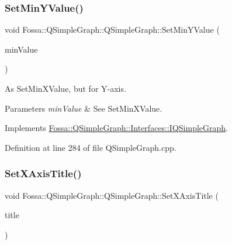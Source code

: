 \subsubsection{\texorpdfstring{Set\+Min\+Y\+Value()}{SetMinYValue()}}
{\footnotesize\ttfamily void Fossa\+::\+Q\+Simple\+Graph\+::\+Q\+Simple\+Graph\+::\+Set\+Min\+Y\+Value (\begin{DoxyParamCaption}\item[{double}]{min\+Value }\end{DoxyParamCaption})\hspace{0.3cm}{\ttfamily [virtual]}}



As Set\+Min\+X\+Value, but for Y-\/axis. 


\begin{DoxyParams}{Parameters}
{\em min\+Value} & See Set\+Min\+X\+Value. \\
\hline
\end{DoxyParams}


Implements \hyperlink{class_fossa_1_1_q_simple_graph_1_1_interfaces_1_1_i_q_simple_graph_a3fdd1f6b538e2dfbf4a0140acd6b6e94}{Fossa\+::\+Q\+Simple\+Graph\+::\+Interfaces\+::\+I\+Q\+Simple\+Graph}.



Definition at line 284 of file Q\+Simple\+Graph.\+cpp.

\mbox{\label{class_fossa_1_1_q_simple_graph_1_1_q_simple_graph_a7579da572b54d43ccec3d2bd572b6cfa}} 
\subsubsection{\texorpdfstring{Set\+X\+Axis\+Title()}{SetXAxisTitle()}}
{\footnotesize\ttfamily void Fossa\+::\+Q\+Simple\+Graph\+::\+Q\+Simple\+Graph\+::\+Set\+X\+Axis\+Title (\begin{DoxyParamCaption}\item[{Q\+String}]{title }\end{DoxyParamCaption})\hspace{0.3cm}{\ttfamily [virtual]}}



